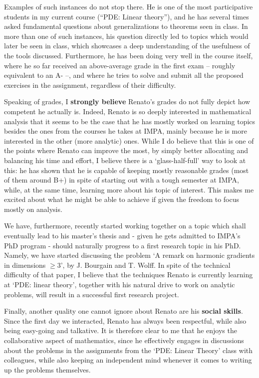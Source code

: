 \documentclass[a4paper,11pt]{letter}
\begin{document}
	Examples of such instances do not stop there. He is one of the most participative students in my current course (``PDE: Linear theory''), and he has several times asked fundamental questions about generalizations to theorems seen in class.  In more than one of such instances, his question directly led to topics which would later be seen in class, which showcases a deep understanding of the usefulness of the tools discussed.  Furthermore, he has been doing very well in the course itself, where he so far received an above-average grade in the first exam -- roughly equivalent to an A- --, and where he tries to solve and submit all the proposed exercises in the assignment,  regardless of their difficulty. 
	
	Speaking of grades, I {\bf strongly believe} Renato's grades do not fully depict how competent he actually is.  Indeed, Renato is so deeply interested in mathematical analysis that it seems to be the case that he has mostly worked on learning topics besides the ones from the courses he takes at IMPA, mainly because he is more interested in the other (more analytic) ones.  While I do believe that this is one of the points where Renato can improve the most, by simply better allocating and balancing his time and effort,  I believe there is a `glass-half-full' way to look at this: he has shown that he is capable of keeping mostly reasonable grades (most of them around B+) in spite of starting out with a tough semester at IMPA, while, at the same time, learning more about his topic of interest.  This makes me excited about what he might be able to achieve if given the freedom to focus mostly on analysis. 
	 
	We have, furthermore, recently started working together on a topic which shall eventually lead to his master's thesis and - given he gets admitted to IMPA's PhD program - should naturally progress to a first research topic in his PhD. Namely, we have started discussing the problem `A remark on harmonic gradients in dimensions $\geq 3$', by J. Bourgain and T. Wolff. In spite of the technical difficulty of that paper, I believe that the techniques Renato is currently learning at `PDE: linear theory', together with his natural drive to work on analytic problems, will result in a successful first research project. 
	
	Finally, another quality one cannot ignore about Renato are his {\bf social skills}. Since the first day we interacted, Renato has always been respectful, while also being easy-going and talkative. It is therefore clear to me that he enjoys the collaborative aspect of mathematics,  since he effectively engages in discussions about the problems in the assignments from the `PDE: Linear Theory' class with colleagues, while also keeping an independent mind whenever it comes to writing up the problems themselves. 
	
\end{document}
